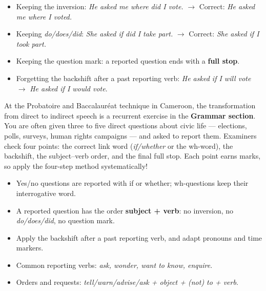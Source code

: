 \documentclass[11pt]{article}
\newcommand{\cle}[1]{{\popxbold\color{popdark}#1}}
\begin{document}
\begin{attention}
\begin{itemize}
\item Keeping the inversion: \emph{He asked me where did I vote.} $\rightarrow$ Correct: \emph{He asked me where I voted.}
\item Keeping \emph{do/does/did}: \emph{She asked if did I take part.} $\rightarrow$ Correct: \emph{She asked if I took part.}
\item Keeping the question mark: a reported question ends with a \textbf{full stop}.
\item Forgetting the backshift after a past reporting verb: \emph{He asked if I will vote} $\rightarrow$ \emph{He asked if I would vote}.
\end{itemize}
\end{attention}

\begin{savaistu}
At the Probatoire and Baccalauréat technique in Cameroon, the transformation from direct to indirect speech is a recurrent exercise in the \textbf{Grammar section}. You are often given three to five direct questions about civic life --- elections, polls, surveys, human rights campaigns --- and asked to report them. Examiners check four points: the correct link word (\emph{if/whether} or the wh-word), the backshift, the subject--verb order, and the final full stop. Each point earns marks, so apply the four-step method systematically!
\end{savaistu}

\begin{aretenir}
\begin{itemize}
\item Yes/no questions are reported with \cle{if} or \cle{whether}; wh-questions keep their interrogative word.
\item A reported question has the order \textbf{subject + verb}: no inversion, no \emph{do/does/did}, no question mark.
\item Apply the \cle{backshift} after a past reporting verb, and adapt pronouns and time markers.
\item Common reporting verbs: \emph{ask, wonder, want to know, enquire}.
\item Orders and requests: \emph{tell/warn/advise/ask + object + (not) to + verb}.
\end{itemize}
\end{aretenir}
\end{document}
